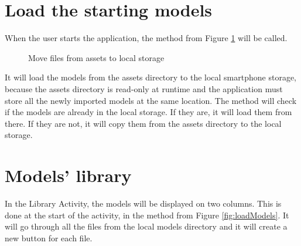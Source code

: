\clearpage

\section{Load the starting models}
When the user starts the application, the method from Figure \ref{fig:tryMoveAssets} will be called.
\begin{figure}[H]
    \centering
    \caption{Move files from assets to local storage}
    \label{fig:tryMoveAssets}
\end{figure}


It will load the models from the assets directory to the local smartphone storage, because the assets directory is read-only at runtime and the application must store all the newly imported models at the same location. The method will check if the models are already in the local storage. If they are, it will load them from there. If they are not, it will copy them from the assets directory to the local storage.

\newpage
\section{Models' library}
In the Library Activity, the models will be displayed on two columns. This is done at the start of the activity, in the method from Figure \ref{fig:loadModels}. It will go through all the files from the local models directory and it will create a new button for each file.

